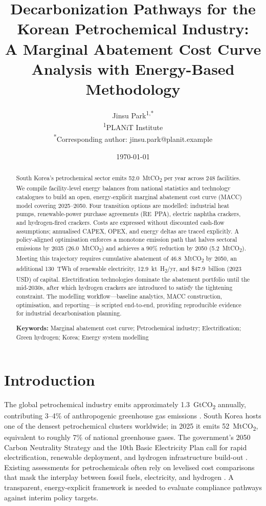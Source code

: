 \documentclass[12pt,a4paper]{article}
\title{Decarbonization Pathways for the Korean Petrochemical Industry: \\
A Marginal Abatement Cost Curve Analysis with Energy-Based Methodology}
\author{
    Jinsu Park\textsuperscript{1,*}\\
    \small \textsuperscript{1}PLANiT Institute\\
    \small \textsuperscript{*}Corresponding author: jinsu.park@planit.example
}
\date{\today}
\begin{document}
\maketitle

\begin{abstract}
South Korea's petrochemical sector emits 52.0~MtCO\textsubscript{2} per year across 248 facilities. We compile facility-level energy balances from national statistics \citep{KEEI2023} and technology catalogues \citep{Woo2025,Arpagaus2018,Sadler2020} to build an open, energy-explicit marginal abatement cost curve (MACC) model covering 2025--2050. Four transition options are modelled: industrial heat pumps, renewable-power purchase agreements (RE~PPA), electric naphtha crackers, and hydrogen-fired crackers. Costs are expressed without discounted cash-flow assumptions; annualised CAPEX, OPEX, and energy deltas are traced explicitly. A policy-aligned optimisation enforces a monotone emission path that halves sectoral emissions by 2035 (26.0~MtCO\textsubscript{2}) and achieves a 90\% reduction by 2050 (5.2~MtCO\textsubscript{2}). Meeting this trajectory requires cumulative abatement of 46.8~MtCO\textsubscript{2} by 2050, an additional 130~TWh of renewable electricity, 12.9~kt~H\textsubscript{2}/yr, and \$47.9~billion (2023 USD) of capital. Electrification technologies dominate the abatement portfolio until the mid-2030s, after which hydrogen crackers are introduced to satisfy the tightening constraint. The modelling workflow---baseline analytics, MACC construction, optimisation, and reporting---is scripted end-to-end, providing reproducible evidence for industrial decarbonisation planning.

\textbf{Keywords:} Marginal abatement cost curve; Petrochemical industry; Electrification; Green hydrogen; Korea; Energy system modelling
\end{abstract}

\section{Introduction}
\label{sec:intro}

The global petrochemical industry emits approximately 1.3~GtCO\textsubscript{2} annually, contributing 3--4\% of anthropogenic greenhouse gas emissions \citep{IEA2020}. South Korea hosts one of the densest petrochemical clusters worldwide; in 2025 it emits 52~MtCO\textsubscript{2}, equivalent to roughly 7\% of national greenhouse gases. The government's 2050 Carbon Neutrality Strategy and the 10th Basic Electricity Plan call for rapid electrification, renewable deployment, and hydrogen infrastructure build-out \citep{Korea10thPlan}. Existing assessments for petrochemicals often rely on levelised cost comparisons that mask the interplay between fossil fuels, electricity, and hydrogen \citep{Tiggeloven2022}. A transparent, energy-explicit framework is needed to evaluate compliance pathways against interim policy targets.
\end{document}
